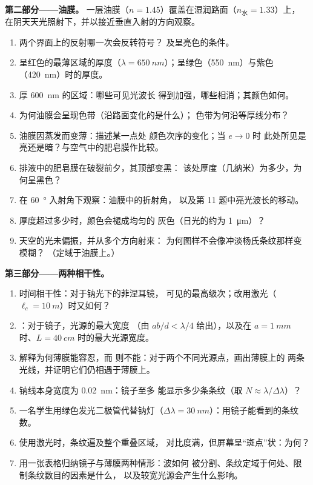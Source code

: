 \begin{problem}
\medskip
\noindent\textbf{第二部分——油膜。}
一层油膜（$n = 1.45$）覆盖在湿润路面（$n_{\text{水}} = 1.33$）上，
在阴天天光照射下，并以接近垂直入射的方向观察。
\begin{enumerate}[resume]
  \item 两个界面上的反射哪一次会反转符号？
        及呈亮色的条件。
  \item 呈红色的最薄区域的厚度（$\lambda =
        \qty{650}{nm}$）；呈绿色（\qty{550}{nm}）与紫色（\qty{420}{nm}）时的厚度。
  \item 厚 \qty{600}{nm} 的区域：哪些可见光波长
        得到加强，哪些相消；其颜色如何。
  \item 为何油膜会呈现色带（沿路面变化的是什么）；
        色带为何沿等厚线分布？
  \item 油膜因蒸发而变薄：描述某一点处
        颜色次序的变化；当 $e \to 0$ 时
        此处所见是亮还是暗？与空气中的肥皂膜作比较。
  \item 排液中的肥皂膜在破裂前夕，其顶部变黑：
        该处厚度（几纳米）为多少，为何呈黑色？
  \item 在 \qty{60}{\degree} 入射角下观察：油膜中的折射角，
        以及第 11 题中亮光波长的移动。
  \item 厚度超过多少时，颜色会褪成均匀的
        灰色（日光的约为 \qty{1}{\micro m}）？
  \item 天空的光未偏振，并从多个方向射来：
        为何图样不会像冲淡杨氏条纹那样变模糊？
        （定域于油膜上。）
\end{enumerate}

\medskip
\noindent\textbf{第三部分——两种相干性。}
\begin{enumerate}[resume]
  \item 时间相干性：对于钠光下的菲涅耳镜，
        可见的最高级次；改用激光（$\ell_c = \qty{10}{m}$）时又如何？
  \item {}：对于镜子，光源的最大宽度
        （由 $ab/d < \lambda/4$ 给出），以及在 $a = \qty{1}{mm}$
        时、$L = \qty{40}{cm}$ 时的最大光源宽度。
  \item 解释为何薄膜能容忍，而
        则不能：对于两个不同光源点，画出薄膜上的
        两条光线，并证明它们仍相遇于薄膜上。
  \item 钠线本身宽度为 \qty{0.02}{nm}：镜子至多
        能显示多少条条纹（取 $N \approx \lambda/\Delta\lambda$）？
  \item 一名学生用绿色发光二极管代替钠灯（$\Delta\lambda =
        \qty{30}{nm}$）：用镜子能看到的条纹数。
  \item 使用激光时，条纹遍及整个重叠区域，
        对比度满，但屏幕呈“斑点”状：为何？
  \item 用一张表格归纳镜子与薄膜两种情形：波如何
        被分割、条纹定域于何处、限制条纹数目的因素是什么，
        以及较宽光源会产生什么影响。
\end{enumerate}
\end{problem}
